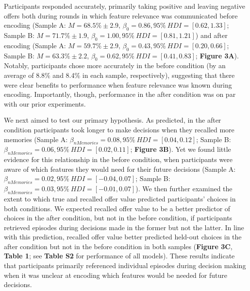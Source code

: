 \documentclass[10pt,letterpaper]{article}
\begin{document}
Participants responded accurately, primarily taking positive and leaving negative offers both during rounds in which feature relevance was communicated before encoding (Sample A: $M = 68.5\% \pm 2.9$, $\beta_{0} = 0.86, 95\% \ HDI = [0.62, 1.33]$; Sample B: $M = 71.7\% \pm 1.9$, $\beta_{0} = 1.00, 95\% \ HDI = [0.81, 1.21]$) and after encoding (Sample A: $M = 59.7\% \pm 2.9$, $\beta_{0} = 0.43, 95\% \ HDI = [0.20, 0.66]$; Sample B: $M = 63.3\% \pm 2.2$, $\beta_{0} = 0.62, 95\% \ HDI = [0.41, 0.83]$; \textbf{Figure 3A}). Notably, participants chose more accurately in the before condition (by an average of 8.8\% and 8.4\% in each sample, respectively), suggesting that there were clear benefits to performance when feature relevance was known during encoding. Importantly, though, performance in the after condition was on par with our prior experiments.  

We next aimed to test our primary hypothesis. As predicted, in the after condition participants took longer to make decisions when they recalled more memories (Sample A: $\beta_{nMemories} = 0.08, 95\% \ HDI = [0.04, 0.12]$; Sample B: $\beta_{nMemories} = 0.06, 95\% \ HDI = [0.02, 0.11]$; \textbf{Figure 3B}). Yet we found little evidence for this relationship in the before condition, when participants were aware of which features they would need for their future decisions (Sample A: $\beta_{nMemories} = 0.02, 95\% \ HDI = [-0.04, 0.07]$; Sample B: $\beta_{nMemories} = 0.03, 95\% \ HDI = [-0.01, 0.07]$). We then further examined the extent to which true and recalled offer value predicted participants' choices in both conditions. We expected recalled offer value to be a better predictor of choices in the after condition, but not in the before condition, if participants retrieved episodes during decisions made in the former but not the latter. In line with this prediction, recalled offer value better predicted held-out choices in the after condition but not in the before condition in both samples (\textbf{Figure 3C}, \textbf{Table 1}; see \textbf{Table S2} for performance of all models). These results indicate that participants primarily referenced individual episodes during decision making when it was unclear at encoding which features would be needed for future decisions.
\end{document}
